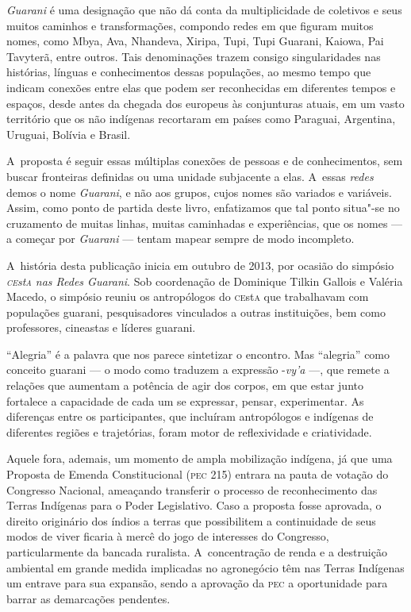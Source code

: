 \emph{Guarani} é uma designação que não dá conta da multiplicidade de coletivos
e seus muitos caminhos e transformações, compondo redes em que figuram
muitos nomes, como Mbya, Ava, Nhandeva, Xiripa, Tupi, Tupi Guarani,
Kaiowa, Pai Tavyterã, entre outros. Tais denominações trazem consigo
singularidades nas histórias, línguas e conhecimentos dessas
populações, ao mesmo tempo que indicam conexões entre elas que podem
ser reconhecidas em diferentes tempos e espaços, desde antes da chegada
dos europeus às conjunturas atuais, em um vasto território que os não
indígenas recortaram em países como Paraguai, Argentina, Uruguai,
Bolívia e Brasil.

A~proposta é seguir essas múltiplas conexões de pessoas e de
conhecimentos, sem buscar fronteiras definidas ou uma unidade
subjacente a elas. A~essas \emph{redes} demos o nome \emph{Guarani}, e não aos
grupos, cujos nomes são variados e variáveis. Assim, como ponto de
partida deste livro, enfatizamos que tal ponto situa"-se no cruzamento
de muitas linhas, muitas caminhadas e experiências, que os nomes --- a
começar por \emph{Guarani} --- tentam mapear sempre de modo incompleto.

A~história desta publicação inicia em outubro de 2013, por ocasião do
simpósio \emph{\textsc{ce}st\textsc{a} nas Redes Guarani}. Sob coordenação de Dominique Tilkin
Gallois e Valéria Macedo, o simpósio reuniu os antropólogos do \textsc{ce}st\textsc{a}
que trabalhavam com populações guarani, pesquisadores vinculados a
outras instituições, bem como professores, cineastas e líderes guarani.

``Alegria'' é a palavra que nos parece sintetizar o encontro. Mas ``alegria''
como conceito guarani --- o modo como traduzem a expressão -\emph{vy’a} ---, que
remete a relações que aumentam a potência de agir dos corpos, em que
estar junto fortalece a capacidade de cada um se expressar, pensar,
experimentar. As diferenças entre os participantes, que incluíram
antropólogos e indígenas de diferentes regiões e trajetórias, foram
motor de reflexividade e criatividade.

Aquele fora, ademais, um momento de ampla mobilização indígena, já que
uma Proposta de Emenda Constitucional (\textsc{pec} 215) entrara na pauta de
votação do Congresso Nacional, ameaçando transferir o processo de
reconhecimento das Terras Indígenas para o Poder Legislativo. Caso a
proposta fosse aprovada, o direito originário dos índios a terras que
possibilitem a continuidade de seus modos de viver ficaria à mercê do
jogo de interesses do Congresso, particularmente da bancada ruralista.
A~concentração de renda e a destruição ambiental em grande medida
implicadas no agronegócio têm nas Terras Indígenas um entrave para sua
expansão, sendo a aprovação da \textsc{pec} a oportunidade para barrar as
demarcações pendentes.

